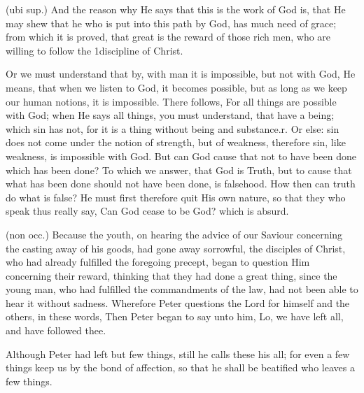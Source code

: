  (ubi sup.) And the reason why He says that this is the work of God is, that He may shew that he who is put into this path by God, has much need of grace; from which it is proved, that great is the reward of those rich men, who are willing to follow the 1discipline of Christ.

 Or we must understand that by, with man it is impossible, but not with God, He means, that when we listen to God, it becomes possible, but as long as we keep our human notions, it is impossible. There follows, For all things are possible with God; when He says all things, you must understand, that have a being; which sin has not, for it is a thing without being and substance.r. Or else: sin does not come under the notion of strength, but of weakness, therefore sin, like weakness, is impossible with God. But can God cause that not to have been done which has been done? To which we answer, that God is Truth, but to cause that what has been done should not have been done, is falsehood. How then can truth do what is false? He must first therefore quit His own nature, so that they who speak thus really say, Can God cease to be God? which is absurd.

 

 (non occ.) Because the youth, on hearing the advice of our Saviour concerning the casting away of his goods, had gone away sorrowful, the disciples of Christ, who had already fulfilled the foregoing precept, began to question Him concerning their reward, thinking that they had done a great thing, since the young man, who had fulfilled the commandments of the law, had not been able to hear it without sadness. Wherefore Peter questions the Lord for himself and the others, in these words, Then Peter began to say unto him, Lo, we have left all, and have followed thee.

 Although Peter had left but few things, still he calls these his all; for even a few things keep us by the bond of affection, so that he shall be beatified who leaves a few things.

